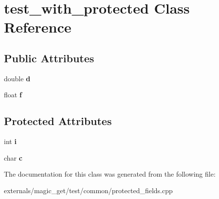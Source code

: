 \hypertarget{classtest__with__protected}{}\section{test\+\_\+with\+\_\+protected Class Reference}
\label{classtest__with__protected}
\subsection*{Public Attributes}
\begin{DoxyCompactItemize}
\item 
\mbox{\label{classtest__with__protected_a8618c6a5f5ed9c6e9698ade75337e50c}} 
double {\bfseries d}
\item 
\mbox{\label{classtest__with__protected_a7341ea98c8072aa09d1dd5247d0bee00}} 
float {\bfseries f}
\end{DoxyCompactItemize}
\subsection*{Protected Attributes}
\begin{DoxyCompactItemize}
\item 
\mbox{\label{classtest__with__protected_a5ddd617d7bd2e5652207f5a663390791}} 
int {\bfseries i}
\item 
\mbox{\label{classtest__with__protected_ae00781042a98e46d2c8bf5703c76c9d6}} 
char {\bfseries c}
\end{DoxyCompactItemize}


The documentation for this class was generated from the following file\+:\begin{DoxyCompactItemize}
\item 
externals/magic\+\_\+get/test/common/protected\+\_\+fields.\+cpp\end{DoxyCompactItemize}

